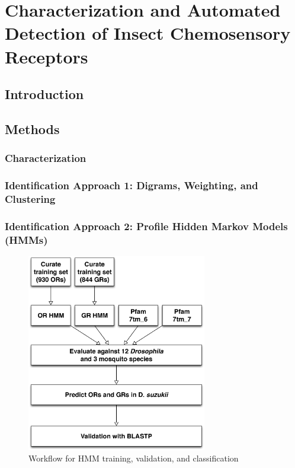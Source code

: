 \section{Characterization and Automated Detection of Insect Chemosensory Receptors}

\subsection{Introduction}

\subsection{Methods}

\subsubsection{Characterization}

\subsubsection{Identification Approach 1: Digrams, Weighting, and Clustering}

\subsubsection{Identification Approach 2: Profile Hidden Markov Models (HMMs)}

\begin{figure}[H]
  \centering
  \includegraphics[width=0.7\textwidth]{figures/chemosensory/hmm_workflow}
  \caption{Workflow for HMM training, validation, and classification}
  \label{fig:chemosensory:hmm-workflow}
\end{figure}

